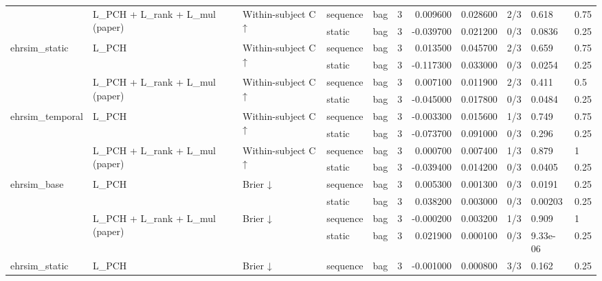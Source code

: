 \begin{tabular}{lllllrrrlll}
\cline{2-11} \cline{3-11}
 & \multirow[t]{2}{*}{L\_PCH + L\_rank + L\_mul (paper)} & \multirow[t]{2}{*}{Within-subject C ↑} & sequence & bag & 3 & 0.009600 & 0.028600 & 2/3 & 0.618 & 0.75 \\
 &  &  & static & bag & 3 & -0.039700 & 0.021200 & 0/3 & 0.0836 & 0.25 \\
\cline{1-11} \cline{2-11} \cline{3-11}
\multirow[t]{4}{*}{ehrsim\_static} & \multirow[t]{2}{*}{L\_PCH} & \multirow[t]{2}{*}{Within-subject C ↑} & sequence & bag & 3 & 0.013500 & 0.045700 & 2/3 & 0.659 & 0.75 \\
 &  &  & static & bag & 3 & -0.117300 & 0.033000 & 0/3 & 0.0254 & 0.25 \\
\cline{2-11} \cline{3-11}
 & \multirow[t]{2}{*}{L\_PCH + L\_rank + L\_mul (paper)} & \multirow[t]{2}{*}{Within-subject C ↑} & sequence & bag & 3 & 0.007100 & 0.011900 & 2/3 & 0.411 & 0.5 \\
 &  &  & static & bag & 3 & -0.045000 & 0.017800 & 0/3 & 0.0484 & 0.25 \\
\cline{1-11} \cline{2-11} \cline{3-11}
\multirow[t]{4}{*}{ehrsim\_temporal} & \multirow[t]{2}{*}{L\_PCH} & \multirow[t]{2}{*}{Within-subject C ↑} & sequence & bag & 3 & -0.003300 & 0.015600 & 1/3 & 0.749 & 0.75 \\
 &  &  & static & bag & 3 & -0.073700 & 0.091000 & 0/3 & 0.296 & 0.25 \\
\cline{2-11} \cline{3-11}
 & \multirow[t]{2}{*}{L\_PCH + L\_rank + L\_mul (paper)} & \multirow[t]{2}{*}{Within-subject C ↑} & sequence & bag & 3 & 0.000700 & 0.007400 & 1/3 & 0.879 & 1 \\
 &  &  & static & bag & 3 & -0.039400 & 0.014200 & 0/3 & 0.0405 & 0.25 \\
\cline{1-11} \cline{2-11} \cline{3-11}
\multirow[t]{4}{*}{ehrsim\_base} & \multirow[t]{2}{*}{L\_PCH} & \multirow[t]{2}{*}{Brier ↓} & sequence & bag & 3 & 0.005300 & 0.001300 & 0/3 & 0.0191 & 0.25 \\
 &  &  & static & bag & 3 & 0.038200 & 0.003000 & 0/3 & 0.00203 & 0.25 \\
\cline{2-11} \cline{3-11}
 & \multirow[t]{2}{*}{L\_PCH + L\_rank + L\_mul (paper)} & \multirow[t]{2}{*}{Brier ↓} & sequence & bag & 3 & -0.000200 & 0.003200 & 1/3 & 0.909 & 1 \\
 &  &  & static & bag & 3 & 0.021900 & 0.000100 & 0/3 & 9.33e-06 & 0.25 \\
\cline{1-11} \cline{2-11} \cline{3-11}
\multirow[t]{4}{*}{ehrsim\_static} & \multirow[t]{2}{*}{L\_PCH} & \multirow[t]{2}{*}{Brier ↓} & sequence & bag & 3 & -0.001000 & 0.000800 & 3/3 & 0.162 & 0.25 \\

\end{tabular}
